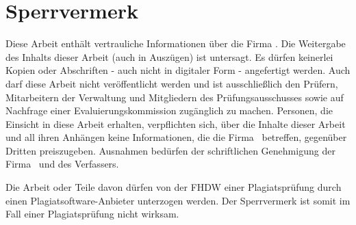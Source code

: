 \section*{Sperrvermerk}

Diese Arbeit enthält vertrauliche Informationen über die Firma \kooperationsunternehmen. Die Weitergabe des Inhalts dieser Arbeit (auch in Auszügen) ist untersagt. Es dürfen keinerlei Kopien oder Abschriften - auch nicht in digitaler Form - angefertigt werden. Auch darf diese Arbeit nicht veröffentlicht werden und ist ausschließlich den Prüfern, Mitarbeitern der Verwaltung und Mitgliedern des Prüfungsausschusses sowie auf Nachfrage einer Evaluierungskommission zugänglich zu machen. Personen, die Einsicht in diese Arbeit erhalten, verpflichten sich, über die Inhalte dieser Arbeit und all ihren Anhängen keine Informationen, die die Firma \kooperationsunternehmen\ betreffen, gegenüber Dritten preiszugeben. Ausnahmen bedürfen der schriftlichen Genehmigung der Firma \kooperationsunternehmen\ und des Verfassers.


Die Arbeit oder Teile davon dürfen von der FHDW einer Plagiatsprüfung durch einen Plagiatsoftware-Anbieter unterzogen werden. Der Sperrvermerk ist somit im Fall einer Plagiatsprüfung nicht wirksam.

\newpage
\fancyhead[L]{\slshape\nouppercase\leftmark}